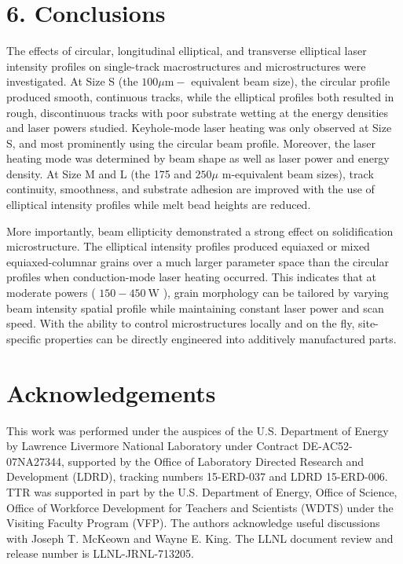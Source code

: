 \documentclass[10pt]{article}
\begin{document}
\section*{6. Conclusions}
The effects of circular, longitudinal elliptical, and transverse elliptical laser intensity profiles on single-track macrostructures and microstructures were investigated. At Size S (the $100 \mu \mathrm{m}-$ equivalent beam size), the circular profile produced smooth, continuous tracks, while the elliptical profiles both resulted in rough, discontinuous tracks with poor substrate wetting at the energy densities and laser powers studied. Keyhole-mode laser heating was only observed at Size S, and most prominently using the circular beam profile. Moreover, the laser heating mode was determined by beam shape as well as laser power and energy density. At Size M and L (the 175 and $250 \mu$ m-equivalent beam sizes), track continuity, smoothness, and substrate adhesion are improved with the use of elliptical intensity profiles while melt bead heights are reduced.

More importantly, beam ellipticity demonstrated a strong effect on solidification microstructure. The elliptical intensity profiles produced equiaxed or mixed equiaxed-columnar grains over a much larger parameter space than the circular profiles when conduction-mode laser heating occurred. This indicates that at moderate powers ( $150-450 \mathrm{~W}$ ), grain morphology can be tailored by varying beam intensity spatial profile while maintaining constant laser power and scan speed. With the ability to control microstructures locally and on the fly, site-specific properties can be directly engineered into additively manufactured parts.

\section*{Acknowledgements}
This work was performed under the auspices of the U.S. Department of Energy by Lawrence Livermore National Laboratory under Contract DE-AC52-07NA27344, supported by the Office of Laboratory Directed Research and Development (LDRD), tracking numbers 15-ERD-037 and LDRD 15-ERD-006. TTR was supported in part by the U.S. Department of Energy, Office of Science, Office of Workforce Development for Teachers and Scientists (WDTS) under the Visiting Faculty Program (VFP). The authors acknowledge useful discussions with Joseph T. McKeown and Wayne E. King. The LLNL document review and release number is LLNL-JRNL-713205.
\end{document}
